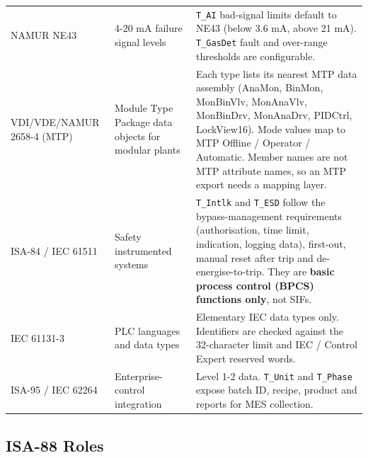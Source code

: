 \begin{small}
\begin{longtable}{@{}P{3.10cm}P{3.30cm}P{10.53cm}@{}}
NAMUR NE43 & 4-20 mA failure signal levels & \texttt{T\_AI} bad-signal limits default to NE43 (below 3.6 mA, above 21 mA). \texttt{T\_GasDet} fault and over-range thresholds are configurable. \\
VDI/\allowbreak{}VDE/\allowbreak{}NAMUR 2658-4 (MTP) & Module Type Package data objects for modular plants & Each type lists its nearest MTP data assembly (AnaMon, BinMon, MonBinVlv, MonAnaVlv, MonBinDrv, MonAnaDrv, PIDCtrl, LockView16). Mode values map to MTP Offline /\allowbreak{} Operator /\allowbreak{} Automatic. Member names are not MTP attribute names, so an MTP export needs a mapping layer. \\
ISA-84 /\allowbreak{} IEC 61511 & Safety instrumented systems & \texttt{T\_Intlk} and \texttt{T\_ESD} follow the bypass-management requirements (authorisation, time limit, indication, logging data), first-out, manual reset after trip and de-energise-to-trip. They are \textbf{basic process control (BPCS) functions only}, not SIFs. \\
IEC 61131-3 & PLC languages and data types & Elementary IEC data types only. Identifiers are checked against the 32-character limit and IEC /\allowbreak{} Control Expert reserved words. \\
ISA-95 /\allowbreak{} IEC 62264 & Enterprise-control integration & Level 1-2 data. \texttt{T\_Unit} and \texttt{T\_Phase} expose batch ID, recipe, product and reports for MES collection. \\
\bottomrule
\end{longtable}
\end{small}

\subsection{ISA-88 Roles}

